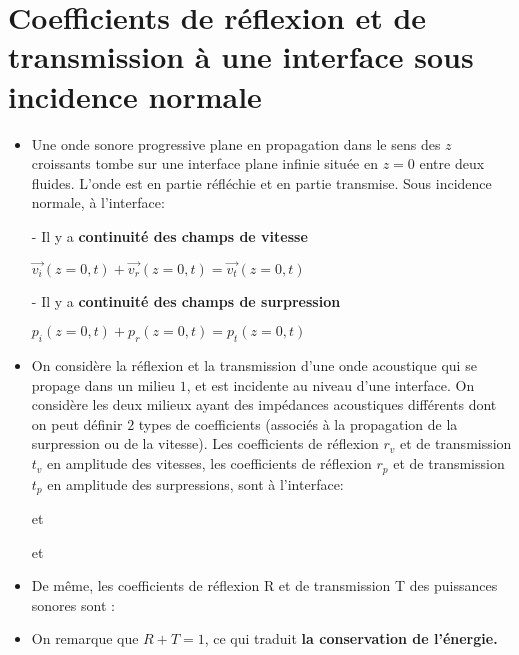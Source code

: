 \documentclass[a4paper]{article}
\begin{document}
\section{Coefficients de réflexion et de transmission à une interface sous incidence normale}
\begin{itemize}
\item Une onde sonore progressive plane en propagation dans le sens des $z$ croissants tombe sur une interface plane infinie située en $z=0$ entre deux fluides. L'onde est en partie réfléchie et en partie transmise. Sous incidence normale, à l'interface:
\item[-] Il y a \textbf{continuité des champs de vitesse}
\begin{center}
$\overrightarrow{v_{i}}(z=0,t)+\overrightarrow{v_{r}}(z=0,t)=\overrightarrow{v_{t}}(z=0,t)$
\end{center}
\item[-] Il y a \textbf{continuité des champs de surpression}
\begin{center}
$p_{i}(z=0,t)+p_{r}(z=0,t)=p_{t}(z=0,t)$
\end{center}

\item On considère la réflexion et la transmission d'une onde acoustique qui se propage dans un milieu $1$, et est incidente au niveau d'une interface. On considère les deux milieux ayant des impédances acoustiques différents dont on peut définir $2$ types de coefficients (associés à la propagation de la surpression ou de la vitesse). Les coefficients de réflexion $r_{v}$ et de transmission $t_{v}$ en amplitude des vitesses, les coefficients de réflexion $r_{p}$ et de transmission $t_{p}$ en amplitude des surpressions, sont à l'interface:
\begin{center}
 et 
\end{center}
\begin{center}
 et 
\end{center}

\item De même, les coefficients de réflexion R et de transmission T des puissances sonores sont :
\begin{center}
\end{center}
\begin{center}
\end{center}

\item On remarque que $R+T=1$, ce qui traduit \textbf{la conservation de l'énergie.}

\end{itemize}
\end{document}

